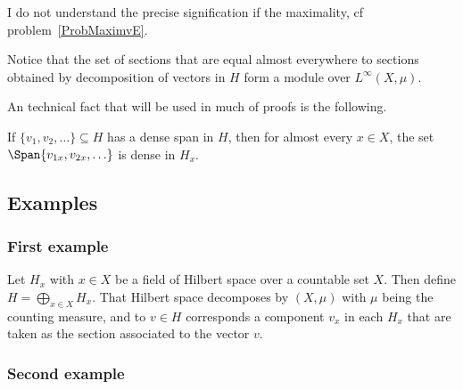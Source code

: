 \begin{probleme}
I do not understand the precise signification if the maximality, cf problem~\ref{ProbMaximvE}.
\end{probleme}

Notice that the set of sections that are equal almost everywhere to sections obtained by decomposition of vectors in $H$ form a module over $L^{\infty}(X,\mu)$.


An technical fact that will be used in much of proofs is the following.

\begin{lemma}		\label{LemdensHdensHx}
If $\{ v_1,v_2,\ldots \}\subseteq H$ has a dense span in $H$, then for almost every $x\in X$, the set $\Span\{ v_{1x},v_{2x},\ldots \}$ is dense in $H_x$.
\end{lemma}

					\subsection{Examples}

					\subsubsection{First example}



Let $H_x$ with $x\in X$ be a field of Hilbert space over a countable set $X$. Then define $H=\bigoplus_{x\in X}H_x$. That Hilbert space decomposes by $(X,\mu)$ with $\mu$ being the counting measure, and to $v\in H$ corresponds a component $v_x$ in each $H_x$ that are taken as the section associated to the vector $v$.

					\subsubsection{Second example}


